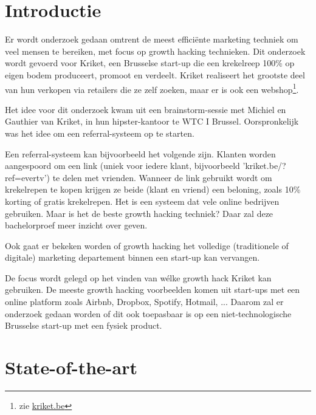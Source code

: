 
\section{Introductie} %
\label{sec:introductie}

Er wordt onderzoek gedaan omtrent de meest efficiënte marketing techniek om veel mensen te bereiken, met focus op growth hacking technieken. Dit onderzoek wordt gevoerd voor Kriket, een Brusselse start-up die een krekelreep 100\% op eigen bodem produceert, promoot en verdeelt. Kriket realiseert het grootste deel van hun verkopen via retailers die ze zelf zoeken, maar er is ook een webshop\footnote{zie \href{https://kriket.be}{kriket.be}}.

Het idee voor dit onderzoek kwam uit een brainstorm-sessie met Michiel en Gauthier van Kriket, in hun hipster-kantoor te WTC I Brussel. Oorspronkelijk was het idee om een referral-systeem op te starten. 

Een referral-systeem kan bijvoorbeeld het volgende zijn. Klanten worden aangespoord om een link (uniek voor iedere klant, bijvoorbeeld 'kriket.be/?ref=evertv') te delen met vrienden. Wanneer de link gebruikt wordt om krekelrepen te kopen krijgen ze beide (klant en vriend) een beloning, zoals 10\% korting of gratis krekelrepen. Het is een systeem dat vele online bedrijven gebruiken. Maar is het de beste growth hacking techniek? Daar zal deze bachelorproef meer inzicht over geven.

Ook gaat er bekeken worden of growth hacking het volledige (traditionele of digitale) marketing departement binnen een start-up kan vervangen.

De focus wordt gelegd op het vinden van wélke growth hack Kriket kan gebruiken. De meeste growth hacking voorbeelden komen uit start-ups met een online platform zoals Airbnb, Dropbox, Spotify, Hotmail, ... Daarom zal er onderzoek gedaan worden of dit ook toepasbaar is op een niet-technologische Brusselse start-up met een fysiek product.


\section{State-of-the-art}
\label{sec:state-of-the-art}

